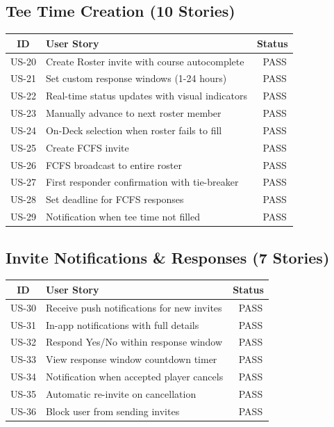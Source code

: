 \documentclass[11pt,a4paper]{article}
\newcommand{\pass}{\textcolor{pass}{\checkmark\ PASS}}
\begin{document}
\subsection{Tee Time Creation (10 Stories)}
\begin{tabular}{|c|p{9cm}|c|}
\hline
\textbf{ID} & \textbf{User Story} & \textbf{Status} \\
\hline
US-20 & Create Roster invite with course autocomplete & \pass \\
\hline
US-21 & Set custom response windows (1-24 hours) & \pass \\
\hline
US-22 & Real-time status updates with visual indicators & \pass \\
\hline
US-23 & Manually advance to next roster member & \pass \\
\hline
US-24 & On-Deck selection when roster fails to fill & \pass \\
\hline
US-25 & Create FCFS invite & \pass \\
\hline
US-26 & FCFS broadcast to entire roster & \pass \\
\hline
US-27 & First responder confirmation with tie-breaker & \pass \\
\hline
US-28 & Set deadline for FCFS responses & \pass \\
\hline
US-29 & Notification when tee time not filled & \pass \\
\hline
\end{tabular}


\subsection{Invite Notifications \& Responses (7 Stories)}
\begin{tabular}{|c|p{9cm}|c|}
\hline
\textbf{ID} & \textbf{User Story} & \textbf{Status} \\
\hline
US-30 & Receive push notifications for new invites & \pass \\
\hline
US-31 & In-app notifications with full details & \pass \\
\hline
US-32 & Respond Yes/No within response window & \pass \\
\hline
US-33 & View response window countdown timer & \pass \\
\hline
US-34 & Notification when accepted player cancels & \pass \\
\hline
US-35 & Automatic re-invite on cancellation & \pass \\
\hline
US-36 & Block user from sending invites & \pass \\
\hline
\end{tabular}
\end{document}
